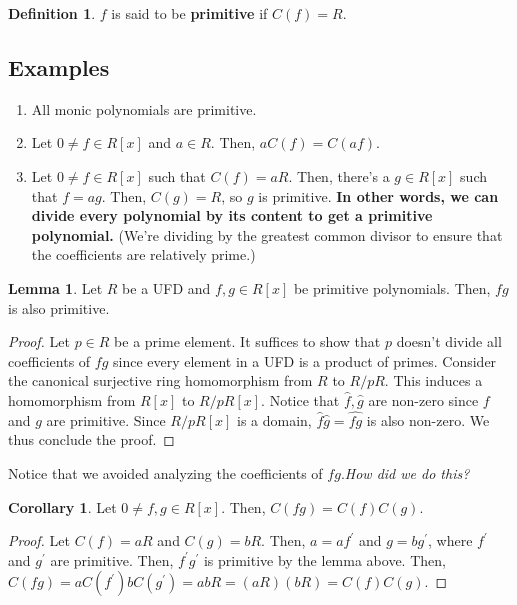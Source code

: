\documentclass{article}
\theoremstyle{definition}
\newtheorem{definition}{Definition}
\newtheorem{lemma}[theorem]{Lemma}
\newtheorem{corollary}{Corollary}[theorem]
\begin{document}
\begin{definition}
    $f$ is said to be \textbf{primitive} if $C(f) = R$.
\end{definition}

\subsection{Examples}

\begin{enumerate}
    \item All monic polynomials are primitive.
    \item Let $0 \neq f \in R[x]$ and $a \in R$. Then, $a C(f) = C(af)$.
    \item Let $0 \neq f \in R[x]$ such that $C(f) = aR$. Then, there's a $g \in R[x]$ such that $f = ag$. Then, $C(g) = R$, so $g$ is primitive. \textbf{In other words, we can divide every polynomial by its content to get a primitive polynomial.} (We're dividing by the greatest common divisor to ensure that the coefficients are relatively prime.)
\end{enumerate}

\begin{lemma}
    Let $R$ be a UFD and $f,g \in R[x]$ be primitive polynomials. Then, $fg$ is also primitive.
\end{lemma}
\begin{proof}
    Let $p \in R$ be a prime element. It suffices to show that $p$ doesn't divide all coefficients of $fg$ since every element in a UFD is a product of primes. Consider the canonical surjective ring homomorphism from $R$ to $R/pR$. This induces a homomorphism from $R[x]$ to $R/pR[x]$. Notice that $\hat{f}, \hat{g}$ are non-zero since $f$ and $g$ are primitive. Since $R/pR[x]$ is a domain, $\hat{f}\hat{g} = \hat{fg}$ is also non-zero. We thus conclude the proof.
\end{proof}

Notice that we avoided analyzing the coefficients of $fg$.\textit{How did we do this?}

\begin{corollary}
    Let $0 \neq f,g \in R[x]$. Then, $C(fg) = C(f)C(g)$.
\end{corollary}
\begin{proof}
    Let $C(f) = aR$ and $C(g) = bR$. Then, $a = af^{\prime}$ and $g = b g^{\prime}$, where $f^{\prime}$ and $g^{\prime}$ are primitive. Then, $f^{\prime}g^{\prime}$ is primitive by the lemma above. Then, $C(fg) = aC(f^{\prime})bC(g^{\prime}) = abR = (aR)(bR) = C(f)C(g)$. 
\end{proof}
\end{document}
